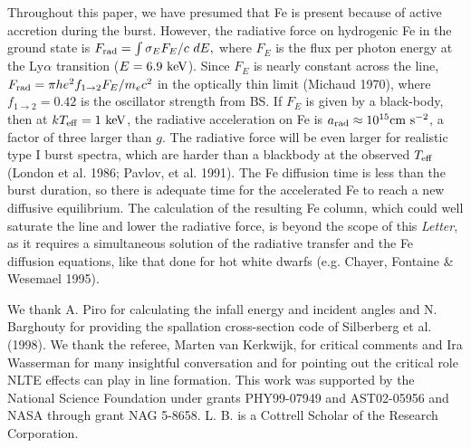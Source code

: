 \documentclass[iop,apjl,letterpaper]{emulateapj}
\begin{document}
 Throughout this paper, we have presumed that Fe is present because of
active accretion during the burst. However, the radiative force on
hydrogenic Fe in the ground state is $F_{\rm rad} = \int {\sigma_{E}
F_{E}}/{c}\ dE,$ where $F_{E}$ is the flux per photon energy at the
Ly$\alpha$ transition ($E=6.9\ {\rm keV}$). Since $F_{E}$ is nearly
constant across the line, $F_{\rm rad}= \pi h e^2 f_{1\rightarrow 2}
F_E/m_e c^2$ in the optically thin limit (Michaud 1970), where
$f_{1\rightarrow 2}=0.42$ is the oscillator strength from BS. If $F_E$
is given by a black-body, then at $kT_{\rm eff} = 1\ {\rm keV}$, the
radiative acceleration on Fe is $a_{\rm rad} \approx 10^{15} {\rm cm\
s}^{-2}$, a factor of three larger than $g$. The radiative force will
be even larger for realistic type I burst spectra, which are harder
than a blackbody at the observed $T_{\rm eff}$ (London et al. 1986;
Pavlov, et al. 1991).  The Fe diffusion time is less than the burst
duration, so there is adequate time for the accelerated Fe to reach a
new diffusive equilibrium. The calculation of the resulting Fe column,
which could well saturate the line and lower the radiative force, is
beyond the scope of this {\it Letter}, as it requires a simultaneous
solution of the radiative transfer and the Fe diffusion equations,
like that done for hot white dwarfs (e.g. Chayer, Fontaine \& Wesemael
1995).

\acknowledgments

 We thank A. Piro for calculating the infall energy and incident
angles and N. Barghouty for providing the spallation cross-section
code of Silberberg et al. (1998). We thank the referee, Marten van
Kerkwijk, for critical comments and Ira Wasserman for many insightful
conversation and for pointing out the critical role NLTE effects can
play in line formation. This work was supported by the National
Science Foundation under grants PHY99-07949 and AST02-05956 and NASA
through grant NAG 5-8658.  L. B. is a Cottrell Scholar of the Research
Corporation.
\end{document}
